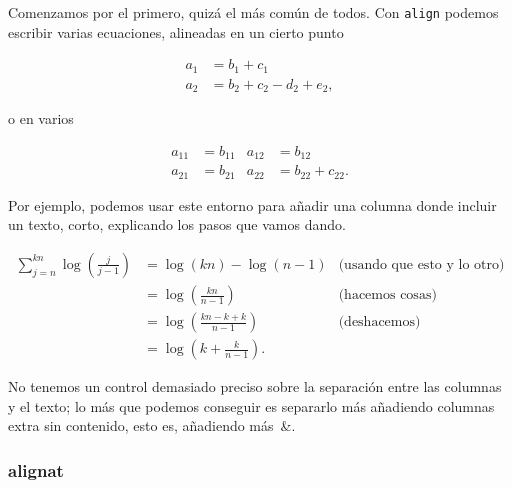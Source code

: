 \documentclass{article}
\numberwithin{equation}{section}
\theoremstyle{plain}
\theoremstyle{definition}
\theoremstyle{remark}
\begin{document}
Comenzamos por el primero, quizá el más común de todos. Con \texttt{align} podemos escribir varias ecuaciones, alineadas en un cierto punto
\begin{codigo-arriba}
	\begin{align}
		a_1 & = b_1 + c_1\\
		a_2 & = b_2 + c_2 - d_2 + e_2,
	\end{align}
\end{codigo-arriba}
o en varios
\begin{codigo-arriba}
	\begin{align}
	a_{11} & = b_{11} & a_{12} & = b_{12}\\
	a_{21} & = b_{21} & a_{22} & = b_{22}+c_{22}.
	\end{align}
\end{codigo-arriba}
Por ejemplo, podemos usar este entorno para añadir una columna donde incluir un texto, corto, explicando los pasos que vamos dando.
\begin{codigo-arriba}
	\begin{align*}
		\sum_{j=n}^{kn} \log\left( \frac{j}{j-1}\right) & =\log \left( kn\right)-\log \left( n-1\right) & \text{(usando que esto y lo otro)} \\
			& = \log \left( \frac{kn}{n-1}\right) & \text{(hacemos cosas)}\\
			& = \log \left( \frac{kn-k+k}{n-1}\right) & \text{(deshacemos)} \\
			& = \log\left( k+\frac{k}{n-1}\right) .
	\end{align*}
\end{codigo-arriba}	
No tenemos un control demasiado preciso sobre la separación entre las columnas y el texto; lo más que podemos conseguir es separarlo más añadiendo columnas extra sin contenido, esto es, añadiendo más~\&.

\subsubsection{alignat}
\end{document}
